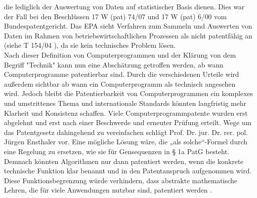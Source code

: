 die lediglich der Auswertung von Daten auf statistischer Basis dienen.
Dies war der Fall bei den Beschlüssen 17 W (pat) 74/07\cite{BPatG10012012}
und 17 W (pat) 6/00 \cite{BPatG01032001} vom Bundespatentgericht.
Das EPA sieht Verfahren zum Sammeln und Auswerten von Daten 
im Rahmen von betriebswirtschaftlichen Prozessen als nicht patentfähig an 
(siehe T 154/04 \cite{EuropaischesPatentamt152006}),
da sie kein technisches Problem lösen.
\\
Nach dieser Definition von Computerprogrammen und der Klärung von dem Begriff
"Technik" kann nun eine Abschätzung getroffen werden, 
ab wann Computerprogramme patentierbar sind. 
Durch die verschiedenen Urteile wird außerdem sichtbar 
ab wann ein Computerprogramm als technisch angesehen wird.
Jedoch bleibt die Patentierbarkeit von Computerprogrammen 
ein komplexes und umstrittenes Thema 
und internationale Standards könnten 
langfristig mehr Klarheit und Konsistenz schaffen.
Viele Computerprogrammpatente wurden erst abgelehnt und erst nach 
einer Beschwerde und erneuter Prüfung erteilt.
Wege um das Patentgesetz dahingehend zu vereinfachen schlägt 
Prof. Dr. jur. Dr. rer. pol. Jürgen Ensthaler vor. 
Eine mögliche Lösung wäre, die „als solche“-Formel durch eine Regelung zu ersetzen, 
wie sie für Gensequenzen in § 1a PatG besteht. 
Demnach könnten Algorithmen nur dann patentiert werden, 
wenn die konkrete technische Funktion klar benannt 
und in den Patentanspruch aufgenommen wird. 
Diese Funktionsbegrenzung würde verhindern, 
dass abstrakte mathematische Lehren, 
die für viele Anwendungen nutzbar sind, patentiert werden 
\cite{ensthalerEnsthalerBegrenzungPatentierung2013}. 








